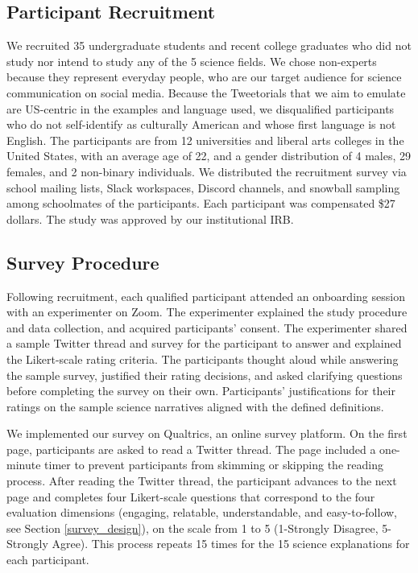 \subsection{Participant Recruitment}
\label{Recruitment}
\label{user-study1}
We recruited 35 undergraduate students and recent college graduates who did not study nor intend to study any of the 5 science fields. We chose non-experts because they represent everyday people, who are our target audience for science communication on social media. Because the Tweetorials that we aim to emulate are US-centric in the examples and language used, we disqualified participants who do not self-identify as culturally American and whose first language is not English. The participants are from 12 universities and liberal arts colleges in the United States, with an average age of 22, and a gender distribution of 4 males, 29 females, and 2 non-binary individuals. We distributed the recruitment survey via school mailing lists, Slack workspaces, Discord channels, and snowball sampling \cite{goodman_snowball_1961} among schoolmates of the participants. Each participant was compensated \$27 dollars. The study was approved by our institutional IRB. 




\subsection{Survey Procedure}
Following recruitment, each qualified participant attended an onboarding session with an experimenter on Zoom. The experimenter explained the study procedure and data collection, and acquired participants' consent. The experimenter shared a sample Twitter thread and survey for the participant to answer and explained the Likert-scale rating criteria. The participants thought aloud while answering the sample survey, justified their rating decisions, and asked clarifying questions before completing the survey on their own. Participants' justifications for their ratings on the sample science narratives aligned with the defined definitions. 

We implemented our survey on Qualtrics, an online survey platform. On the first page, participants are asked to read a Twitter thread. The page included a one-minute timer to prevent participants from skimming or skipping the reading process. After reading the Twitter thread, the participant advances to the next page and completes four Likert-scale questions that correspond to the four evaluation dimensions (engaging, relatable, understandable, and easy-to-follow, see Section \ref{survey_design}), on the scale from 1 to 5 (1-Strongly Disagree, 5-Strongly Agree). This process repeats 15 times for the 15 science explanations for each participant. 

